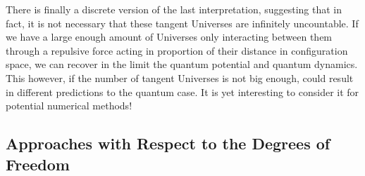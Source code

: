 \documentclass[11pt, a4paper]{article} %
\begin{document}
There is finally a discrete version of the last interpretation, suggesting that in fact, it is not necessary that these tangent Universes are infinitely uncountable. If we have a large enough amount of Universes only interacting between them through a repulsive force acting in proportion of their distance in configuration space, we can recover in the limit the quantum potential and quantum dynamics. This however, if the number of tangent Universes is not big enough, could result in different predictions to the quantum case. It is yet interesting to consider it for potential numerical methods!
\newpage
{}

\subsection*{Approaches with Respect to the Degrees of Freedom}
\vspace{-0.1cm}
\end{document}
